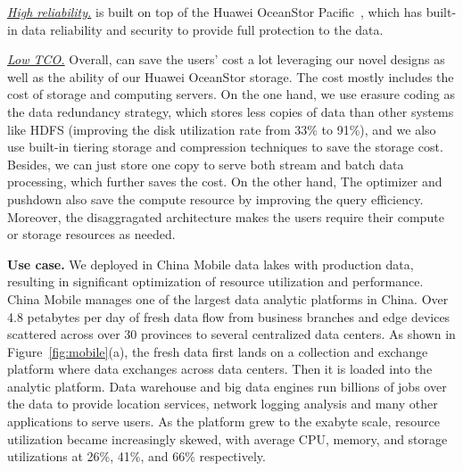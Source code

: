 \noindent \underline{\textit{High reliability.}} \sys is built on top of the Huawei OceanStor Pacific~\cite{huawei}, which has built-in data reliability and security to provide full protection to the data.

\noindent \underline{\textit{Low TCO.}} Overall, \sys can save the users' cost a lot leveraging  our novel designs as well as the ability of our Huawei OceanStor storage. The cost mostly includes the cost of  storage and computing servers. 
On the one hand, we use erasure coding as the data redundancy strategy, which stores less copies of data than other systems like HDFS (improving the disk utilization rate from 33\% to 91\%), and we also use built-in tiering storage and  compression techniques to save the storage cost. Besides, we can just store one copy to serve both  stream and batch data processing, which  further saves the cost.
On the other hand,  The \brain optimizer and  pushdown also  save the compute resource by improving the query efficiency. Moreover, the disaggragated architecture makes the users require their compute or storage resources as needed. 


 





\noindent \textbf{Use case.} We deployed \sys  in China Mobile data lakes with production data, resulting in significant optimization of resource utilization and performance.  China Mobile manages one of the largest data analytic platforms in China.
Over 4.8 petabytes per day of fresh data flow from business branches and edge devices scattered across over 30 provinces to several centralized data centers. As shown in Figure~\ref{fig:mobile}(a), the fresh data first lands on a collection and exchange platform where data exchanges across data centers. Then it is loaded into the analytic platform. Data warehouse and big data engines run billions of jobs  over the data to provide location services, network logging analysis and many other applications to serve users.
As the platform grew to the exabyte scale, resource utilization became increasingly skewed, with average CPU, memory, and storage utilizations at 26\%, 41\%, and 66\% respectively.




